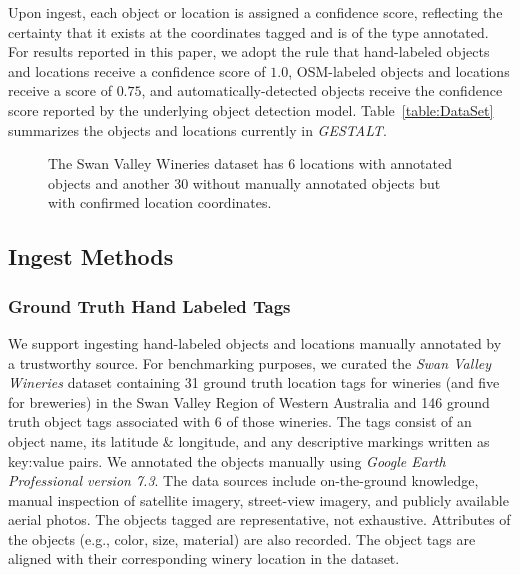 Upon ingest, each object or location is assigned a confidence score, reflecting the certainty that it exists at the coordinates tagged and is of the type annotated. 
For results reported in this paper, we adopt the rule that hand-labeled objects and locations receive a confidence score of $1.0$, OSM-labeled objects and locations receive a score of $0.75$, and automatically-detected objects receive the confidence score reported by the underlying object detection model. Table~\ref{table:DataSet} summarizes the objects and locations currently in \emph{GESTALT}.


\begin{figure}[h!]       
    
        \caption{The Swan Valley Wineries dataset has 6 locations with annotated objects and another 30 without manually annotated objects but with confirmed location coordinates.}
    \label{fig:loc} 
    \vspace{-20pt}
\end{figure}


\subsection{Ingest Methods}
\subsubsection{Ground Truth Hand Labeled Tags} 
We support ingesting hand-labeled objects and locations manually annotated by a trustworthy source. 
For benchmarking purposes, we curated the \emph{Swan Valley Wineries} dataset containing 31 ground truth location tags for wineries (and five for breweries) in the Swan Valley Region of Western Australia and 146 ground truth object tags associated with 6 of those wineries. 
The tags consist of an object name, its latitude \& longitude, and any descriptive markings written as key:value pairs. 
We annotated the objects manually using \textit{Google Earth Professional version 7.3}. 
The data sources include on-the-ground knowledge, manual inspection of satellite imagery, street-view imagery, and publicly available aerial photos. 
The objects tagged are representative, not exhaustive. 
Attributes of the objects (e.g., color, size, material) are also recorded. 
The object tags are aligned with their corresponding winery location in the dataset.


